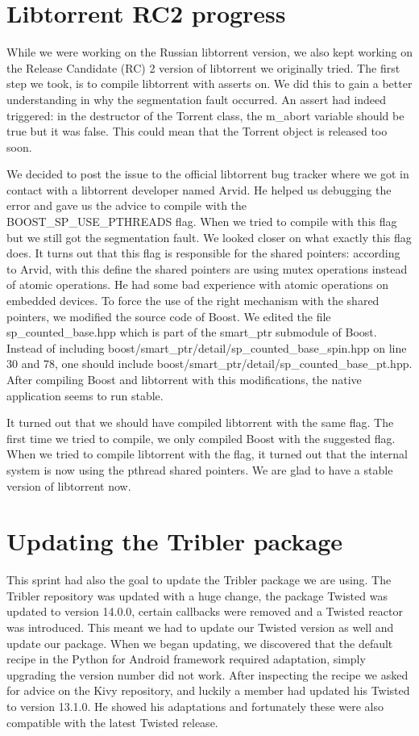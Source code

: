 	\section{Libtorrent RC2 progress}
		While we were working on the Russian libtorrent version, we also kept working on the Release Candidate (RC) 2 version of libtorrent we originally tried. The first step we took, is to compile libtorrent with asserts on. We did this to gain a better understanding in why the segmentation fault occurred. An assert had indeed triggered: in the destructor of the Torrent class, the m\_abort variable should be true but it was false. This could mean that the Torrent object is released too soon.
		
		We decided to post the issue to the official libtorrent bug tracker where we got in contact with a libtorrent developer named Arvid. He helped us debugging the error and gave us the advice to compile with the BOOST\_SP\_USE\_PTHREADS flag. When we tried to compile with this flag but we still got the segmentation fault. We looked closer on what exactly this flag does. It turns out that this flag is responsible for the shared pointers: according to Arvid, with this define the shared pointers are using mutex operations instead of atomic operations. He had some bad experience with atomic operations on embedded devices. To force the use of the right mechanism with the shared pointers, we modified the source code of Boost. We edited the file sp\_counted\_base.hpp which is part of the smart\_ptr submodule of Boost. Instead of including boost/smart\_ptr/detail/sp\_counted\_base\_spin.hpp on line 30 and 78, one should include boost/smart\_ptr/detail/sp\_counted\_base\_pt.hpp. After compiling Boost and libtorrent with this modifications, the native application seems to run stable.
		
		It turned out that we should have compiled libtorrent with the same flag. The first time we tried to compile, we only compiled Boost with the suggested flag. When we tried to compile libtorrent with the flag, it turned out that the internal system is now using the pthread shared pointers. We are glad to have a stable version of libtorrent now.
				
	\section{Updating the Tribler package}
		This sprint had also the goal to update the Tribler package we are using. The Tribler repository was updated with a huge change, the package Twisted was updated to version 14.0.0, certain callbacks were removed and a Twisted reactor was introduced. This meant we had to update our Twisted version as well and update our package.
		When we began updating, we discovered that the default recipe in the Python for Android framework required adaptation, simply upgrading the version number did not work. After inspecting the recipe we asked for advice on the Kivy repository, and luckily a member had updated his Twisted to version 13.1.0. He showed his adaptations and fortunately these were also compatible with the latest Twisted release.
		

